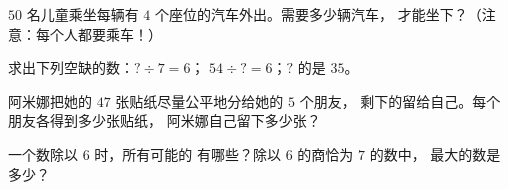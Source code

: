 \begin{exercise}[$\star$]\label{exo:g3:division:8}
$50$ 名儿童乘坐每辆有 $4$ 个座位的汽车外出。需要多少辆汽车，
才能坐下？（注意：每个人都要乘车！）
\end{exercise}

\begin{exercise}[$\star$]\label{exo:g3:division:9}
求出下列空缺的数：$? \div 7 = 6$；\quad
$54 \div ? = 6$；\quad $?$ 的是 $35$。
\end{exercise}

\begin{exercise}[$\star\star$]\label{exo:g3:division:10}
阿米娜把她的 $47$ 张贴纸尽量公平地分给她的 $5$ 个朋友，
剩下的留给自己。每个朋友各得到多少张贴纸，
阿米娜自己留下多少张？
\end{exercise}

\begin{exercise}[$\star\star$]\label{exo:g3:division:11}
一个数除以 $6$ 时，所有可能的
有哪些？除以 $6$ 的商恰为 $7$ 的数中，
最大的数是多少？
\end{exercise}

